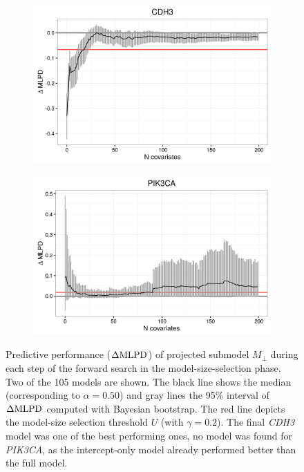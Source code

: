 \begin{figure}[!h]
  \centering
  \begin{subfigure}{.45\textwidth}
    \includegraphics[width=1\linewidth]{figures/CDH3_CV_path.png}
  \end{subfigure}
  \begin{subfigure}{.45\textwidth}
    \includegraphics[width=1\linewidth]{figures/PIK3CA_CV_path.png}
  \end{subfigure}

  \caption{Predictive performance ($\Delta\textup{MLPD}$) of projected submodel $M_\perp$ during
  each step of the forward search in the model-size-selection phase. Two of the 105 models are shown.
  The black line shows the median (corresponding to $\alpha = 0.50$) and
  gray lines the 95\% interval of $\Delta\textup{MLPD}$ computed with Bayesian bootstrap.
  The red line depicts the model-size selection threshold $U$ (with $\gamma=0.2$).
  The final \emph{CDH3} model was one of the best performing ones,
  no model was found for \emph{PIK3CA}, as the intercept-only model
  already performed better than the full model.}
  \label{fig:forward-search}
\end{figure}

